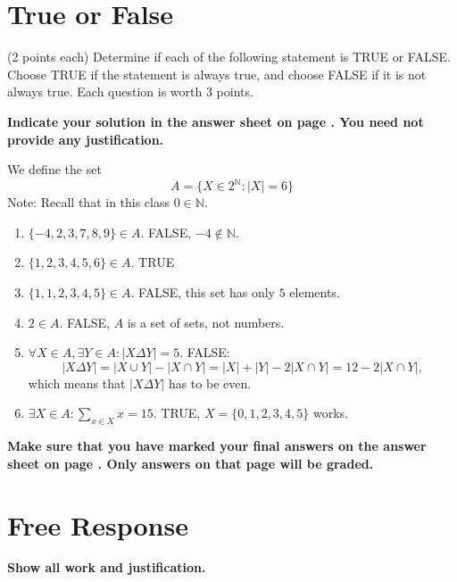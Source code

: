 \documentclass[12pt]{article}
\begin{document}
\newpage
\section*{True or False}

(2 points each) Determine if each of the following statement is TRUE or FALSE.\\Choose TRUE if the statement is always true, and choose FALSE if it is not always true. Each question is worth 3 points.

\vspace{0.2cm}

\noindent
\textbf{Indicate your solution in the answer sheet on page \pageref{answersheet}.  You need not provide any justification.}

We define the set
\[
A=\{X\in 2^{\mathbb{N}}:|X|=6\}
\]
Note: Recall that in this class $0\in\mathbb{N}$.
\begin{enumerate}
\item $\{-4,2,3,7,8,9\}\in A$. FALSE, $-4\notin\mathbb{N}$.
\vspace{1cm}
\item $\{1,2,3,4,5,6\}\in A$. TRUE
\vspace{1cm}
\item $\{1,1,2,3,4,5\}\in A$. FALSE, this set has only $5$ elements.
\vspace{1cm}
\item $2\in A$. FALSE, $A$ is a set of sets, not numbers.
\vspace{1cm}
\item $\forall X\in A, \exists Y\in A: |X\Delta Y|=5$. FALSE:
\[
|X\Delta Y|=|X\cup Y|-|X\cap Y|=|X|+|Y|-2|X\cap Y|=12-2|X\cap Y|,
\]
which means that $|X\Delta Y|$ has to be even.
\vspace{1cm}
\item $\exists X\in A: \sum_{x\in X}x=15$. TRUE, $X=\{0,1,2,3,4,5\}$ works.
\end{enumerate}
\begin{center}
\textbf{Make sure that you have marked your final answers on the answer sheet on page \pageref{answersheet}. Only answers on that page will be graded.}
\end{center}
\newpage
\section*{Free Response}

\textbf{Show all work and justification.} 
\end{document}
